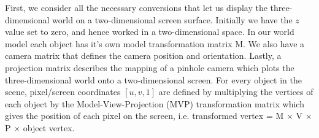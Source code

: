 \documentclass[paper=a4, fontsize=11pt]{scrartcl} %
\numberwithin{equation}{section} %
\numberwithin{figure}{section} %
\numberwithin{table}{section} %
\begin{document}
First, we consider all the necessary conversions that let us display the three-dimensional world on a two-dimensional screen surface. Initially we have the \(z\) value set to zero, and hence worked in a two-dimensional space. In our world model each object has it's own model transformation matrix M. We also have a camera matrix that defines the camera position and orientation. Lastly, a projection matrix describes the mapping of a pinhole camera which plots the three-dimensional world onto a two-dimensional screen. For every object in the scene, pixel/screen coordinates \([u, v, 1]\) are defined by multiplying the vertices of each object by the Model-View-Projection (MVP) transformation matrix which gives the position of each pixel on the screen, i.e. transformed vertex = M \(\times\) V \(\times\) P \(\times\) object vertex. \\





\end{document}
